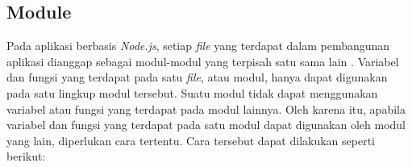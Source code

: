 %			
%			
%			
%			
%			

\subsection{Module}
Pada aplikasi berbasis \textit{Node.js}, setiap \textit{file} yang terdapat dalam pembangunan aplikasi dianggap sebagai modul-modul yang terpisah satu sama lain \cite{dahl:09:nodejsdocs}. Variabel dan fungsi yang terdapat pada satu \textit{file}, atau modul, hanya dapat digunakan pada satu lingkup modul tersebut. Suatu modul tidak dapat menggunakan variabel atau fungsi yang terdapat pada modul lainnya. Oleh karena itu, apabila variabel dan fungsi yang terdapat pada satu modul dapat digunakan oleh modul yang lain, diperlukan cara tertentu. Cara tersebut dapat dilakukan seperti berikut:

